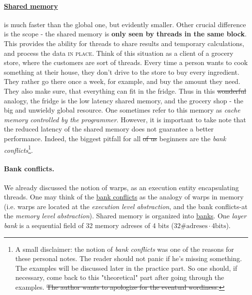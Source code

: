 \documentclass[12pt]{article}
\begin{document}
\vspace{-15pt}
\paragraph{\underline{Shared memory}} \label{grocery_store} is much faster than the global one, but evidently smaller. Other 
crucial difference is the scope - the shared memory is \textbf{only seen by threads in the same block}. This provides 
the ability for threads to share results and temporary calculations, and process the data \textsc{in place}. 
Think of this situation as a client of a grocery store, where the customers are sort of threads. Every time a person 
wants to cook something at their house, they don't drive to the store to buy every ingredient. They rather go there 
once a week, for example, and buy the amount they need. They also make sure, 
that everything can fit in the fridge. Thus 
in this \sout{wonderful} analogy, the fridge is the low latency shared memory, and the grocery shop - the 
big and unwieldy global resource.
One sometimes refer to this memory as 
\textsl{cache memory controlled by the programmer}. However, it is important to take note that the reduced 
latency of the shared memory does not guarantee a better performance. Indeed, the biggest pitfall for all \sout{of us} beginners 
are the \textit{bank conflicts}\footnote{A small disclaimer: the notion of \textit{bank conflicts} was one of the reasons for these personal 
notes. The reader should not panic if he's missing something. The examples will be discussed later in the practice part. So one 
should, if necessary, come back to this "theoretical" part after going through the examples. \sout{The author wants to apologize 
for the eventual wordiness.}}. 

\paragraph{Bank conflicts.}We already discussed the notion of warps, as an execution entity encapsulating threads. 
One may think of the \underline{bank conflicts} as the analogy of warps in memory
 (i.e. warps are located at the \textit{execution level abstraction}, and the 
 bank conflicts-at the \textit{memory level abstraction}). 
 Shared memory is organized into \underline{banks}.
One \textit{layer bank} is a sequential field of 32 memory adreses of 4 bits ($32\text{\#adreses}\cdot 4\text{bits}$). 
\end{document}
